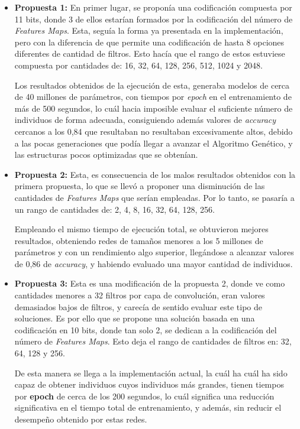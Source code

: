 \begin{itemize}
    \item \textbf{Propuesta 1:} En primer lugar, se proponía una codificación compuesta por 11 bits, donde 3 de ellos estarían formados por la codificación del número de \textit{Features Maps}. Esta, seguía la forma ya presentada en la implementación, pero con la diferencia de que permite una codificación de hasta 8 opciones diferentes de cantidad de filtros. Esto hacía que el rango de estos estuviese compuesta por cantidades de: 16, 32, 64, 128, 256, 512, 1024 y 2048.
    
    Los resultados obtenidos de la ejecución de esta, generaba modelos de cerca de 40 millones de parámetros, con tiempos por \textit{epoch} en el entrenamiento de más de 500 segundos, lo cuál hacia imposible evaluar el suficiente número de individuos de forma adecuada, consiguiendo además valores de \textit{accuracy} cercanos a los 0,84 que resultaban no resultaban excesivamente altos, debido a las pocas generaciones que podía llegar a avanzar el Algoritmo Genético, y las estructuras pocos optimizadas que se obtenían.
    
    \item \textbf{Propuesta 2:} Esta, es consecuencia de los malos resultados obtenidos con la primera propuesta, lo que se llevó a proponer una disminución de las cantidades de \textit{Features Maps} que serían empleadas. Por lo tanto, se pasaría a un rango de cantidades de: 2, 4, 8, 16, 32, 64, 128, 256.
    
    Empleando el mismo tiempo de ejecución total, se obtuvieron mejores resultados, obteniendo redes de tamaños menores a los 5 millones de parámetros y con un rendimiento algo superior, llegándose a alcanzar valores de 0,86 de \textit{accuracy}, y habiendo evaluado una mayor cantidad de individuos. 
    
    \item \textbf{Propuesta 3:} Esta es una modificación de la propuesta 2, donde ve como cantidades menores a 32 filtros por capa de convolución, eran valores demasiados bajos de filtros, y carecía de sentido evaluar este tipo de soluciones. Es por ello que se propone una solución basada en una codificación en 10 bits, donde tan solo 2, se dedican a la codificación del número de \textit{Features Maps}. Esto deja el rango de cantidades de filtros en: 32, 64, 128 y 256. 
    
    De esta manera se llega a la implementación actual, la cuál ha cuál ha sido capaz de obtener individuos cuyos individuos más grandes, tienen tiempos por \textbf{epoch} de cerca de los 200 segundos, lo cuál significa una reducción significativa en el tiempo total de entrenamiento, y además, sin reducir el desempeño obtenido por estas redes.
\end{itemize}

